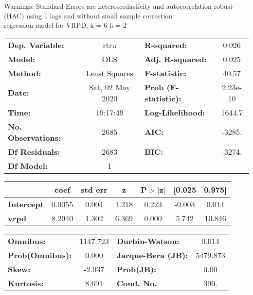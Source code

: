 Warnings: \newline
 [1] Standard Errors are heteroscedasticity and autocorrelation robust (HAC) using 1 lags and without small sample correction\\ 

regression model for VRPD, k = 6 h = 2\begin{center}
\begin{tabular}{lclc}
\toprule
\textbf{Dep. Variable:}    &       rtrn       & \textbf{  R-squared:         } &     0.026   \\
\textbf{Model:}            &       OLS        & \textbf{  Adj. R-squared:    } &     0.025   \\
\textbf{Method:}           &  Least Squares   & \textbf{  F-statistic:       } &     40.57   \\
\textbf{Date:}             & Sat, 02 May 2020 & \textbf{  Prob (F-statistic):} &  2.23e-10   \\
\textbf{Time:}             &     19:17:49     & \textbf{  Log-Likelihood:    } &    1644.7   \\
\textbf{No. Observations:} &        2685      & \textbf{  AIC:               } &    -3285.   \\
\textbf{Df Residuals:}     &        2683      & \textbf{  BIC:               } &    -3274.   \\
\textbf{Df Model:}         &           1      & \textbf{                     } &             \\
\bottomrule
\end{tabular}
\begin{tabular}{lcccccc}
                   & \textbf{coef} & \textbf{std err} & \textbf{z} & \textbf{P$> |$z$|$} & \textbf{[0.025} & \textbf{0.975]}  \\
\midrule
\textbf{Intercept} &       0.0055  &        0.004     &     1.218  &         0.223        &       -0.003    &        0.014     \\
\textbf{vrpd}      &       8.2940  &        1.302     &     6.369  &         0.000        &        5.742    &       10.846     \\
\bottomrule
\end{tabular}
\begin{tabular}{lclc}
\textbf{Omnibus:}       & 1147.723 & \textbf{  Durbin-Watson:     } &    0.014  \\
\textbf{Prob(Omnibus):} &   0.000  & \textbf{  Jarque-Bera (JB):  } & 5479.873  \\
\textbf{Skew:}          &  -2.037  & \textbf{  Prob(JB):          } &     0.00  \\
\textbf{Kurtosis:}      &   8.691  & \textbf{  Cond. No.          } &     390.  \\
\bottomrule
\end{tabular}
\end{center}


